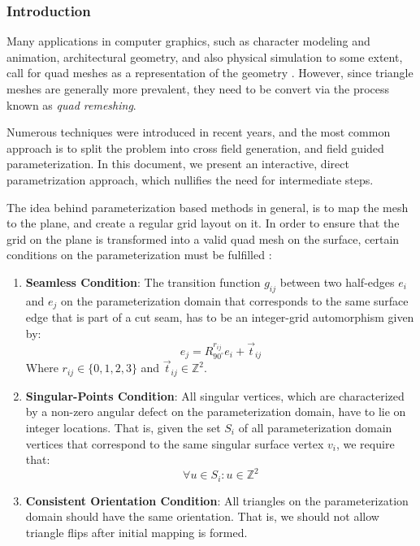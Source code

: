 % 
% 
%
\subsubsection{Introduction}
Many applications in computer graphics, such as character modeling and animation, architectural geometry, and also physical simulation to some extent, call for quad meshes as a representation of the geometry \cite{10.1111/cgf.12014}. However, since triangle meshes are generally more prevalent, they need to be convert via the process known as \emph{quad remeshing}.

\noindent Numerous techniques were introduced in recent years, and the most common approach is to split the problem into cross field generation, and field guided parameterization. In this document, we present an interactive, direct parametrization approach, which nullifies the need for intermediate steps.

\noindent The idea behind parameterization based methods in general, is to map the mesh to the plane, and create a regular grid layout on it. In order to ensure that the grid on the plane is transformed into a valid quad mesh on the surface, certain conditions on the parameterization must be fulfilled \cite{bommes:hal-00862648}:

\begin{enumerate}
  \item \textbf{Seamless Condition}: The transition function $g_{ij}$ between two half-edges $e_i$ and $e_j$ on the parameterization domain that corresponds to the same surface edge that is part of a cut seam, has to be an integer-grid automorphism given by:
  $$e_j = R^{r_{ij}}_{90^\circ}e_i + \vec{t}_{ij}$$
  Where  $r_{ij} \in \{0,1,2,3\}$ and $\vec{t}_{ij} \in \mathbb{Z}^2$.
  
  \item \textbf{Singular-Points Condition}: All singular vertices, which are characterized by a non-zero angular defect on the parameterization domain, have to lie on integer locations. That is, given the set $S_i$ of all parameterization domain vertices that correspond to the same singular surface vertex $v_i$, we require that:
  $$\forall u \in S_i: u \in \mathbb{Z}^2 $$
  
  \item \textbf{Consistent Orientation Condition}: All triangles on the parameterization domain should have the same orientation. That is, we should not allow triangle flips after initial mapping is formed.
\end{enumerate}

